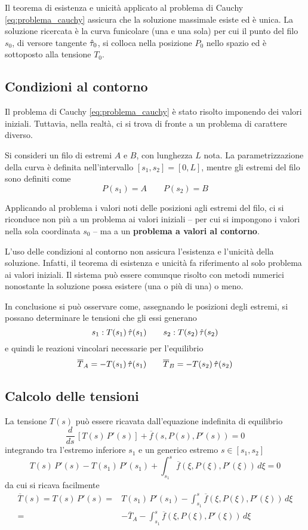 Il teorema di esistenza e unicità applicato al problema di Cauchy \eqref{eq:problema_cauchy} assicura che la soluzione massimale esiste ed è unica.
La soluzione ricercata è la curva funicolare (una e una sola) per cui il punto del filo $s_0$, di versore tangente $\hat{\tau}_0$, si colloca nella posizione $P_0$ nello spazio ed è sottoposto alla tensione $T_0$.

\subsection{Condizioni al contorno}\label{section:condizioni_contorno}
Il problema di Cauchy \eqref{eq:problema_cauchy} è stato risolto imponendo dei valori iniziali. Tuttavia, nella realtà, ci si trova di fronte a un problema di carattere diverso.

Si consideri un filo di estremi $A$ e $B$, con lunghezza $L$ nota. La parametrizzazione della curva è definita nell'intervallo $[s_1, s_2] = [0, L]$, mentre gli estremi del filo sono definiti come
\[
P(s_1)	= A \qquad P(s_2)=B
\]

Applicando al problema i valori noti delle posizioni agli estremi del filo, ci si riconduce non più a un problema ai valori iniziali -- per cui si impongono i valori nella sola coordinata $s_0$ -- ma a un \textbf{problema a valori al contorno}.

L'uso delle condizioni al contorno non assicura l'esistenza e l'unicità della soluzione. Infatti, il teorema di esistenza e unicità fa riferimento al solo problema ai valori iniziali. Il sistema può essere comunque risolto con metodi numerici nonostante la soluzione possa esistere (una o più di una) o meno.

In conclusione si può osservare come, assegnando le posizioni degli estremi, si possano determinare le tensioni che gli essi generano
\[
s_1: T(s_1)\,\hat{\tau}(s_1)\qquad s_2: T(s_2)\,\hat{\tau}(s_2)
\]
e quindi le reazioni vincolari necessarie per l'equilibrio
\[
\overline{T}_A = -	T(s_1)\,\hat{\tau}(s_1)\qquad \overline{T}_B = -T(s_2)\,\hat{\tau}(s_2)
\]

\subsection{Calcolo delle tensioni}
La tensione $T(s)$ può essere ricavata dall'equazione indefinita di equilibrio 
\[
\dfrac{d}{ds}\,\left[T(s)\,P'(s)\right] + \overline{f}(s, P(s), P'(s)) = 0
\] 
integrando tra l'estremo inferiore $s_1$ e un generico estremo $s \in [s_1, s_2]$
\[
T(s)\,P'(s) - T(s_1)\,P'(s_1) + \int_{s_1}^s \overline{f}(\xi, P(\xi), P'(\xi))\,d\xi = 0
\]
da cui si ricava facilmente
\begin{align*}
\overline{T}	(s) = T(s)\,P'(s) =& T(s_1)\,P'(s_1) - \int_{s_1}^s \overline{f}(\xi, P(\xi), P'(\xi))\,d\xi\\
=& - \overline{T}_A - \int_{s_1}^s \overline{f}(\xi, P(\xi), P'(\xi))\,d\xi 
\end{align*}



